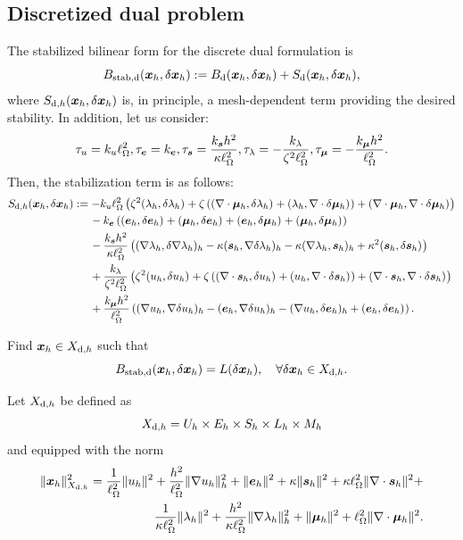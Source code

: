 \subsection{Discretized dual problem} \label{sec:anal_dual}

The stabilized bilinear form for the discrete dual formulation is
$$
\Bsd(\xFh,\delta\xFh) := 
\Bd(\xFh,\delta\xFh)+\Sd(\xFh,\delta\xFh), 
$$
where $\Sdh(\xFh, \delta\xFh)$ is, in principle, a mesh-dependent term providing the desired stability. In addition, let us consider:
$$
    \tu = \ku\length^2,
    \te = \ke,
    \ts = \frac{\ks h^2}{\kappa\length^2},
    \tl = -\frac{\kl}{\zeta^2\length^2},
    \tm = -\frac{\km h^2}{\length^2}.
$$
Then, the stabilization term is as follows:
\begin{align*}
\Sdh(\xFh,\delta\xFh)
&:=-\ku \length^2\left(\zeta^2\iprod[]{\lFh}{\delta\lFh}+\zeta\left(\iprod[]{\nabla\cdot\mFh}{\delta\lFh}+\iprod[]{\lFh}{\nabla\cdot\delta\mFh}\right)+\iprod[]{\nabla\cdot\mFh}{\nabla\cdot\delta \mFh}\right)\\
&\quad\:\:-\ke\left(\iprod[]{\eFh}{\delta\eFh}+\iprod[]{\mFh}{\delta\eFh}+\iprod[]{\eFh}{\delta \mFh}+\iprod[]{\mFh}{\delta\mFh}\right)\\
&\quad\:\:-\frac{\ks h^2}{\kappa\length^2}\left(\iprod[h]{\nabla\lFh}{\delta\nabla\lFh}-\kappa\iprod[h]{\sFh}{\nabla\delta\lFh}-\kappa\iprod[h]{\nabla\lFh}{\sFh}+\kappa^2\iprod[]{\sFh}{\delta\sFh}\right)\\
&\quad\:\:+\frac{\kl}{\zeta^2\length^2}\left(\zeta^2\iprod[]{\uFh}{\delta\uFh}+\zeta\left(\iprod[]{\nabla\cdot\sFh}{\delta\uFh}+\iprod[]{\uFh}{\nabla\cdot\delta\sFh}\right)+\iprod[]{\nabla\cdot\sFh}{\nabla\cdot\delta \sFh}\right)\\
&\quad\:\:+\frac{\km h^2}{\length^2}\left(\iprod[h]{\nabla\uFh}{\nabla\delta\uFh}-
\iprod[h]{\eFh}{\nabla\delta\uFh}-\iprod[h]{\nabla\uFh}{\delta\eFh}+\iprod[]{\eFh}{\delta\eFh}\right). 
\end{align*}
\begin{problem}[$\Pdh$] Find $\xFh\in\XSdh$ such that
\begin{equation}
\Bsd(\xFh,\delta\xFh) = L(\delta\xFh),\quad\forall\delta\xFh\in\XSdh. 
\end{equation} 
\end{problem}

\begin{definition} Let $\XSdh$ be defined as
$$\XSdh =  U_h \times E_h \times S_h \times L_h \times M_h $$
and equipped with the norm
\begin{align*}
\norm[\XSdh]{\xFh}^2 =
\frac{1}{\length^2}\norm[]{\uFh}^2+
\frac{h^2}{\length^2}\norm[h]{\nabla\uFh}^2+
\norm[]{\eFh}^2+
\kappa\norm[]{\sFh}^2+
\kappa\length^2\norm[]{\nabla\cdot\sFh}^2+\\
\frac{1}{\kappa\length^2}\norm[]{\lFh}^2+
\frac{h^2}{\kappa\length^2}\norm[h]{\nabla\lFh}^2+
\norm[]{\mFh}^2+
\length^2\norm[]{\nabla\cdot\mFh}^2.
\end{align*}
\end{definition}

